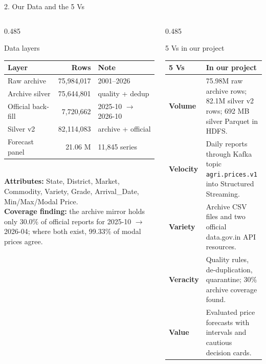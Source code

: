 \documentclass[aspectratio=169,10pt]{beamer}
\begin{document}
\begin{frame}{2. Our Data and the 5 Vs}
  \begin{columns}[T,onlytextwidth]
    \begin{column}{0.485\textwidth}
      \begin{block}{Data layers}
        \scriptsize
        \begin{tabular}{@{}lrl@{}}
          \textbf{Layer} & \textbf{Rows} & \textbf{Note} \\
          \midrule
          Raw archive          & 75,984,017 & 2001--2026 \\
          Archive silver       & 75,644,801 & quality + dedup \\
          Official back-fill   & 7,720,662  & 2025-10 $\to$ 2026-10 \\
          Silver v2            & 82,114,083 & archive + official \\
          Forecast panel       & 21.06 M    & 11,845 series \\
          \midrule
        \end{tabular}\\[0.25em]
        \textbf{Attributes:} State, District, Market, Commodity, Variety, Grade, Arrival\_Date, Min/Max/Modal Price.\\[0.2em]
        \textbf{Coverage finding:} the archive mirror holds only 30.0\% of official reports for 2025-10 $\to$ 2026-04; where both exist, 99.33\% of modal prices agree.
      \end{block}
    \end{column}

    \begin{column}{0.485\textwidth}
      \begin{block}{5 Vs in our project}
        \scriptsize
        \begin{tabular}{lp{5.1cm}}
          \textbf{5 Vs} & \textbf{In our project} \\
          \midrule
          \textbf{Volume}   & 75.98M raw archive rows; 82.1M silver v2 rows; 692 MB silver Parquet in HDFS. \\
          \textbf{Velocity} & Daily reports through Kafka topic \texttt{agri.prices.v1} into Structured Streaming. \\
          \textbf{Variety}  & Archive CSV files and two official data.gov.in API resources. \\
          \textbf{Veracity} & Quality rules, de-duplication, quarantine; 30\% archive coverage found. \\
          \textbf{Value}    & Evaluated price forecasts with intervals and cautious decision cards. \\
        \end{tabular}
      \end{block}
    \end{column}
  \end{columns}


\end{frame}
\end{document}
